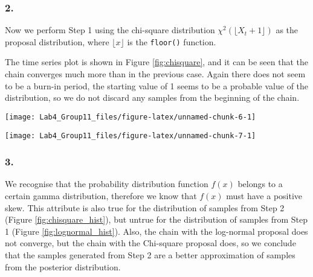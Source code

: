 \documentclass[]{article}
\let\origfigure\figure
\let\endorigfigure\endfigure
\renewenvironment{figure}[1][2] {
    \expandafter\origfigure\expandafter[H]
} {
    \endorigfigure
}
\begin{document}
\hypertarget{section-1}{%
\subsubsection{2.}\label{section-1}}

Now we perform Step 1 using the chi-square distribution
\(\chi^2(\lfloor X_t+1\rfloor)\) as the proposal distribution, where
\(\lfloor x\rfloor\) is the \texttt{floor()} function.

The time series plot is shown in Figure \ref{fig:chisquare}, and it can
be seen that the chain converges much more than in the previous case.
Again there does not seem to be a burn-in period, the starting value of
1 seems to be a probable value of the distribution, so we do not discard
any samples from the beginning of the chain.

\begin{figure}[h]

{\centering \texttt{[image: Lab4\_Group11\_files/figure-latex/unnamed-chunk-6-1]} 

}

\caption{\label{fig:chisquare} Metropolis-Hastings sampler with chi-square proposal}\label{fig:unnamed-chunk-6}
\end{figure}

\begin{figure}[h]

{\centering \texttt{[image: Lab4\_Group11\_files/figure-latex/unnamed-chunk-7-1]} 

}

\caption{\label{fig:chisquare_hist} Histogram of generated samples with Chi-square proposal (MH sampler)}\label{fig:unnamed-chunk-7}
\end{figure}

\hypertarget{section-2}{%
\subsubsection{3.}\label{section-2}}

We recognise that the probability distribution function \(f(x)\) belongs
to a certain gamma distribution, therefore we know that \(f(x)\) must
have a positive skew. This attribute is also true for the distribution
of samples from Step 2 (Figure \ref{fig:chisquare_hist}), but untrue for
the distribution of samples from Step 1 (Figure
\ref{fig:lognormal_hist}). Also, the chain with the log-normal proposal
does not converge, but the chain with the Chi-square proposal does, so
we conclude that the samples generated from Step 2 are a better
approximation of samples from the posterior distribution.
\end{document}
